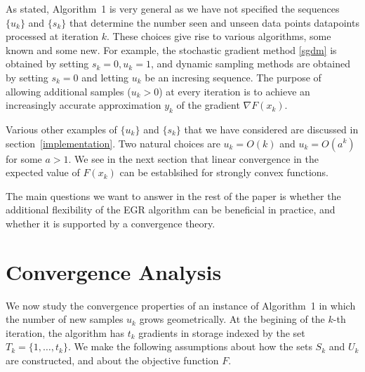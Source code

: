 \documentclass[11pt]{article}
\begin{document}

As stated, Algorithm~1 is very general as we have not specified the sequences $\{ u_k \}$ and $\{ s_k \}$ that determine the number seen and unseen data points datapoints processed at iteration $k$. These choices give rise to various algorithms, some known and some new. For example,  the stochastic gradient method \eqref{sgdm} is obtained by setting $s_k=0, u_k =1$, and dynamic sampling methods are obtained by setting $s_k=0$ and letting $u_k$ be an incresing sequence. The purpose of allowing additional samples ($u_k >0$) at every iteration is to achieve an increasingly accurate approximation $y_k$ of the gradient $\nabla F(x_k)$. 

Various other examples of $\{ u_k \}$ and $\{ s_k \}$ that we have considered are discussed in section~\ref{implementation}. Two natural choices are $u_k = O(k)$ and $u_k = O(a^k)$ for some $a>1$. We see in the next section that linear convergence in the expected value of $F(x_k)$ can be establsihed for strongly convex functions. 

The main questions we want to answer in the rest of the paper is whether the additional flexibility of the EGR algorithm can be beneficial in practice, and whether it is supported by a convergence theory.






\newpage   
\section{Convergence Analysis}  \label{analysis}
We now study the convergence properties of an instance of Algorithm~1 in which the number of new samples $u_k$ grows geometrically. At the begining of the $k$-th iteration, the algorithm has $t_k$ gradients in storage indexed by the set $T_k= \{1, \ldots, t_k\}$. We make the following assumptions about how the sets $S_k$ and $U_k$ are constructed, and about the objective function $F$.

% 
 \bigskip
\end{document}
